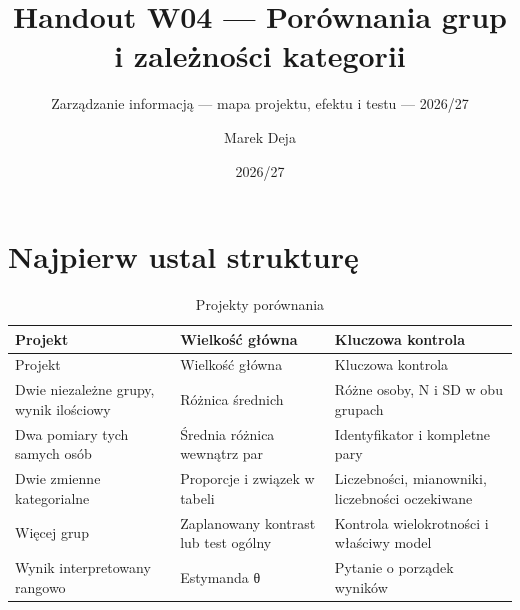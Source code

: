\documentclass[
  polish,
  11pt,
  a4paper,
]{article}
\title{Handout W04 --- Porównania grup i zależności kategorii}
\subtitle{Zarządzanie informacją --- mapa projektu, efektu i testu ---
2026/27}
\author{Marek Deja}
\date{2026/27}
\begin{document}
\maketitle

\section{Najpierw ustal strukturę}\label{najpierw-ustal-strukturux119}

\begin{longtable}[]{@{}
  >{\raggedright\arraybackslash}p{}
  >{\raggedright\arraybackslash}p{}
  >{\raggedright\arraybackslash}p{}@{}}
\caption{Projekty porównania}\tabularnewline
\toprule\noalign{}
\begin{minipage}[b]{\linewidth}\raggedright
Projekt
\end{minipage} & \begin{minipage}[b]{\linewidth}\raggedright
Wielkość główna
\end{minipage} & \begin{minipage}[b]{\linewidth}\raggedright
Kluczowa kontrola
\end{minipage} \\
\midrule\noalign{}
\endfirsthead
\toprule\noalign{}
\begin{minipage}[b]{\linewidth}\raggedright
Projekt
\end{minipage} & \begin{minipage}[b]{\linewidth}\raggedright
Wielkość główna
\end{minipage} & \begin{minipage}[b]{\linewidth}\raggedright
Kluczowa kontrola
\end{minipage} \\
\midrule\noalign{}
\endhead
\bottomrule\noalign{}
\endlastfoot
Dwie niezależne grupy, wynik ilościowy & Różnica średnich & Różne osoby,
N i SD w obu grupach \\
Dwa pomiary tych samych osób & Średnia różnica wewnątrz par &
Identyfikator i kompletne pary \\
Dwie zmienne kategorialne & Proporcje i związek w tabeli & Liczebności,
mianowniki, liczebności oczekiwane \\
Więcej grup & Zaplanowany kontrast lub test ogólny & Kontrola
wielokrotności i właściwy model \\
Wynik interpretowany rangowo & Estymanda θ & Pytanie o porządek
wyników \\
\end{longtable}
\end{document}
